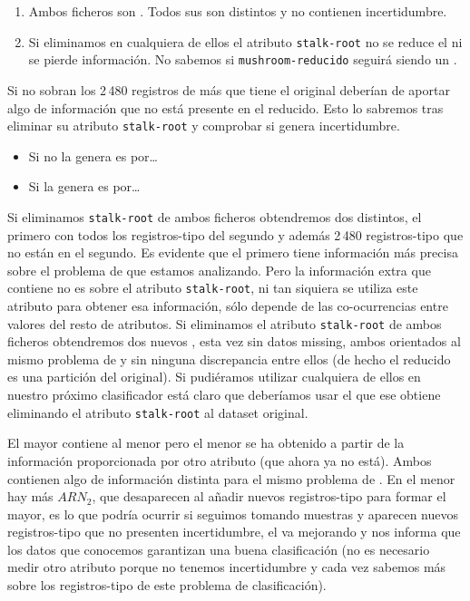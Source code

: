 \begin{enumerate}
  \item Ambos ficheros son \sCCs. Todos sus \registros son distintos y no contienen incertidumbre.
  \item Si eliminamos en cualquiera de ellos el atributo \texttt{stalk-root} no se reduce el \catalogo ni se pierde información. No sabemos si \texttt{mushroom-reducido} seguirá siendo un \sCC.
\end{enumerate}
Si no sobran los 2\,480 registros de más que tiene el \CC original deberían de aportar algo de información que no está presente en el \catalogo reducido. Esto lo sabremos tras eliminar su atributo \texttt{stalk-root} y comprobar si genera incertidumbre.
\begin{itemize}
  \item Si no la genera es por\ldots
  \item Si la genera es por\ldots
\end{itemize}



Si eliminamos \texttt{stalk-root} de ambos ficheros obtendremos dos \sCCs distintos, el primero con todos los registros-tipo del segundo y además 2\,480 registros-tipo que no están en el segundo. Es evidente que el primero tiene información más precisa sobre el problema de \clasificacion que estamos analizando. Pero la información extra que contiene no es sobre el atributo \texttt{stalk-root}, ni tan siquiera se utiliza este atributo para obtener esa información, sólo depende de las co-ocurrencias entre valores del resto de atributos. Si eliminamos el atributo \texttt{stalk-root} de ambos ficheros obtendremos dos nuevos \sCCs, esta vez sin datos missing, ambos orientados al mismo problema de \clasificacion y sin ninguna discrepancia entre ellos (de hecho el reducido es una partición del original). Si pudiéramos utilizar cualquiera de ellos en nuestro próximo clasificador está claro que deberíamos usar el \sCC que ese obtiene eliminando el atributo \texttt{stalk-root} al dataset original.

El \sCC mayor contiene al menor pero el menor se ha obtenido a partir de la información proporcionada por otro atributo (que ahora ya no está). Ambos contienen algo de información distinta para el mismo problema de \clasificacion. En el menor hay más $ARN_2$, que desaparecen al añadir nuevos registros-tipo para formar el mayor, es lo que podría ocurrir si seguimos tomando muestras y aparecen nuevos registros-tipo que no presenten incertidumbre, el \sCC va mejorando y nos informa que los datos que conocemos garantizan una buena clasificación (no es necesario medir otro atributo porque no tenemos incertidumbre y cada vez sabemos más sobre los registros-tipo de este problema de clasificación).







